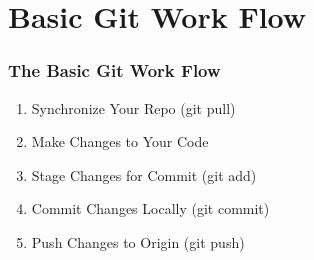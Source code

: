 
\section[Basic Git]{Basic Git Work Flow}

\begin{frame}
\frametitle{\large The Basic Git Work Flow}
\begin{enumerate}
\item Synchronize Your Repo (git pull)
\item Make Changes to Your Code
\item Stage Changes for Commit (git add)
\item Commit Changes Locally (git commit)
\item Push Changes to Origin (git push)
\end{enumerate}
\end{frame}
